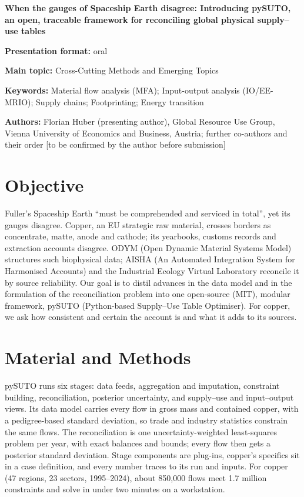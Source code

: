 \documentclass[11pt,a4paper]{article}
\begin{document}
{\Large\bfseries When the gauges of Spaceship Earth disagree: Introducing pySUTO, an open,
traceable framework for reconciling global physical supply--use tables\par}

\medskip
\textbf{Presentation format:} oral

\textbf{Main topic:} Cross-Cutting Methods and Emerging Topics

\textbf{Keywords:} Material flow analysis (MFA); Input-output analysis (IO/EE-MRIO); Supply
chains; Footprinting; Energy transition

\textbf{Authors:} Florian Huber (presenting author), Global Resource Use Group, Vienna
University of Economics and Business, Austria; further co-authors and their order [to be
confirmed by the author before submission]

\section*{Objective}

Fuller's Spaceship Earth ``must be comprehended and serviced in total'', yet its gauges
disagree. Copper, an EU strategic raw material, crosses borders as concentrate, matte,
anode and cathode; its yearbooks, customs records and extraction accounts disagree. ODYM
(Open Dynamic Material Systems Model) structures such biophysical data; AISHA (An Automated
Integration System for Harmonised Accounts) and the Industrial Ecology Virtual Laboratory
reconcile it by source reliability. Our goal is to distil advances in the data model and in
the formulation of the reconciliation problem into one open-source (MIT), modular
framework, pySUTO (Python-based Supply--Use Table Optimiser). For copper, we ask how
consistent and certain the account is and what it adds to its sources.

\section*{Material and Methods}

pySUTO runs six stages: data feeds, aggregation and imputation, constraint building,
reconciliation, posterior uncertainty, and supply--use and input--output views. Its data
model carries every flow in gross mass and contained copper, with a pedigree-based
standard deviation, so trade and industry statistics constrain the same flows. The
reconciliation is one uncertainty-weighted least-squares problem per year, with exact
balances and bounds; every flow then gets a posterior standard deviation. Stage components
are plug-ins, copper's specifics sit in a case definition, and every number traces to its
run and inputs. For copper (47 regions, 23 sectors, 1995--2024), about 850,000 flows meet
1.7 million constraints and solve in under two minutes on a workstation.
\end{document}
